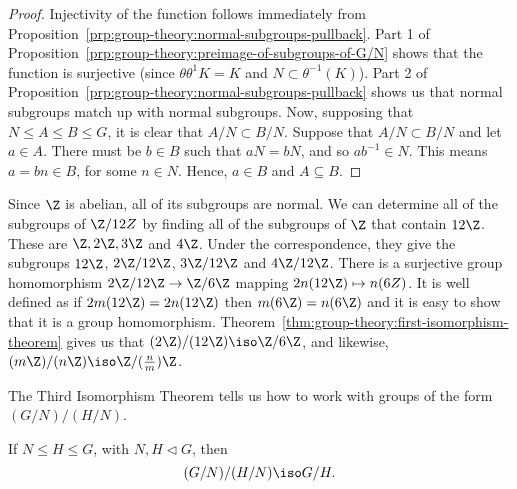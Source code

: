 \documentclass[12pt]{report}
\begin{document}
\begin{proof}
  Injectivity of the function follows immediately from Proposition~\ref{prp:group-theory:normal-subgroups-pullback}.
  Part 1 of Proposition~\ref{prp:group-theory:preimage-of-subgroups-of-G/N} shows that the function is surjective (since \(\theta\theta^{1}K = K\) and \(N \subset \theta^{-1}(K)\)).
  Part 2 of Proposition~\ref{prp:group-theory:normal-subgroups-pullback} shows us that normal subgroups match up with normal subgroups.
  Now, supposing that \(N \leq A \leq B \leq G\), it is clear that \(A/N \subset B/N\).
  Suppose that \(A/N \subset B/N\) and let \(a \in A\).
  There must be \(b \in B\) such that \(aN = bN\), and so \(ab^{-1} \in N\).
  This means \(a = bn \in B\), for some \(n \in N\).
  Hence, \(a \in B\) and \(A \subseteq B\).
\end{proof}

\begin{example}
  Since \(\Z\) is abelian, all of its subgroups are normal.
  We can determine all of the subgroups of \(\Z/12Z\) by finding all of the subgroups of \(\Z\) that contain \(12\Z\).
  These are \(\Z, 2\Z, 3\Z\) and \(4\Z\).
  Under the correspondence, they give the subgroups \(12\Z\), \(2\Z / 12\Z\), \(3\Z / 12\Z\) and \(4\Z / 12\Z\).
  There is a surjective group homomorphism \(2\Z / 12\Z \to \Z/6\Z\) mapping \(2n(12\Z) \mapsto n(6Z)\).
  It is well defined as if \(2m(12\Z) = 2n(12\Z)\) then \(m(6\Z) = n(6\Z)\) and it is easy to show that it is a group homomorphism.
  Theorem~\ref{thm:group-theory:first-isomorphism-theorem} gives us that \((2\Z) / (12\Z) \iso \Z/6\Z\), and likewise, \((m\Z) / (n\Z) \iso \Z/(\frac n m)\Z\).
\end{example}

The Third Isomorphism Theorem tells us how to work with groups of the form \((G/N)/(H/N)\).

\begin{theorem}
  \label{thm:group-theory:the-third-isomorphism-theorem}
  If \(N \leq H \leq G\), with \(N, H \triangleleft G\), then
  \[(G/N)/(H/N) \iso G/H.\]
\end{theorem}
\end{document}
